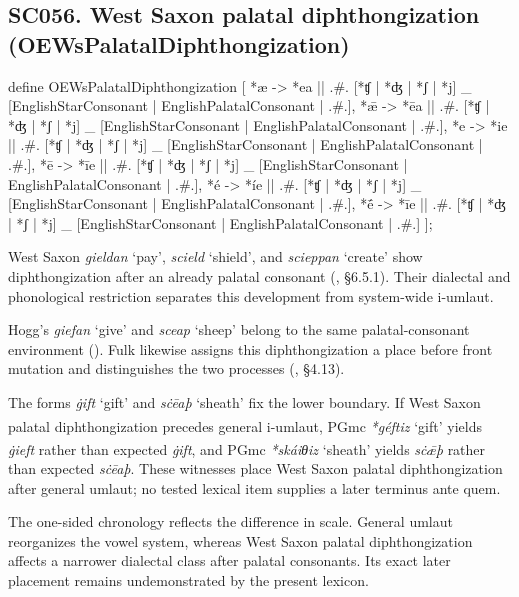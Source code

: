 \documentclass[
  british,
  a4paper,
  openany]{book}
\providecommand{\Pred}[1]{\textsuperscript{\dag}\emph{#1}}
\providecommand{\Recon}[1]{\emph{*#1}}
{\catcode`→=\active \global\def→{\ensuremath{\rightarrow}}}
\providecommand{\texorpdfstring}[2]{#1}
\DeclareRobustCommand{\CAPRRuleHeading}[2]{%
  #1\texorpdfstring{\\(#2)}{ (#2)}%
}
\providecommand{\Pred}[1]{\textsuperscript{\dag}\emph{#1}}
\providecommand{\Recon}[1]{\emph{*#1}}
{\catcode`→=\active \global\def→{\ensuremath{\rightarrow}}}
\begin{document}
\subsection{\texorpdfstring{\CAPRRuleHeading{SC056. West Saxon palatal diphthongization}{OEWsPalatalDiphthongization}}{}}\label{rule-OEWsPalatalDiphthongization}

\begin{ReaderFacingFoma}
define OEWsPalatalDiphthongization [
    {*æ} -> {*ea} || .#. [{*ʧ} | {*ʤ} | {*ʃ} | {*j}] _ [EnglishStarConsonant | EnglishPalatalConsonant | .#.],
    {*ǣ} -> {*ēa} || .#. [{*ʧ} | {*ʤ} | {*ʃ} | {*j}] _ [EnglishStarConsonant | EnglishPalatalConsonant | .#.],
    {*e} -> {*ie} || .#. [{*ʧ} | {*ʤ} | {*ʃ} | {*j}] _ [EnglishStarConsonant | EnglishPalatalConsonant | .#.],
    {*ē} -> {*īe} || .#. [{*ʧ} | {*ʤ} | {*ʃ} | {*j}] _ [EnglishStarConsonant | EnglishPalatalConsonant | .#.],
    {*é} -> {*íe} || .#. [{*ʧ} | {*ʤ} | {*ʃ} | {*j}] _ [EnglishStarConsonant | EnglishPalatalConsonant | .#.],
    {*ḗ} -> {*īe} || .#. [{*ʧ} | {*ʤ} | {*ʃ} | {*j}] _ [EnglishStarConsonant | EnglishPalatalConsonant | .#.]
];
\end{ReaderFacingFoma}

West Saxon \emph{gieldan} `pay', \emph{scield} `shield', and
\emph{scieppan} `create' show diphthongization after an already palatal
consonant (, §6.5.1). Their dialectal and phonological restriction
separates this development from system-wide i-umlaut.

Hogg's \emph{giefan} `give' and \emph{sceap} `sheep' belong to the same
palatal-consonant environment (). Fulk likewise assigns this diphthongization a place before
front mutation and distinguishes the two processes
(, §4.13).

The forms \emph{ġift} `gift' and \emph{sċēaþ} `sheath' fix the lower
boundary. If West Saxon palatal diphthongization precedes general
i-umlaut, PGmc \Recon{géftiz} `gift' yields \Pred{ġieft} rather than
expected \emph{ġift}, and PGmc \Recon{skáiθiz} `sheath' yields
\Pred{sċǣþ} rather than expected \emph{sċēaþ}. These witnesses place
West Saxon palatal diphthongization after general umlaut; no tested
lexical item supplies a later terminus ante quem.

The one-sided chronology reflects the difference in scale. General
umlaut reorganizes the vowel system, whereas West Saxon palatal
diphthongization affects a narrower dialectal class after palatal
consonants. Its exact later placement remains undemonstrated by the
present lexicon.
\end{document}
